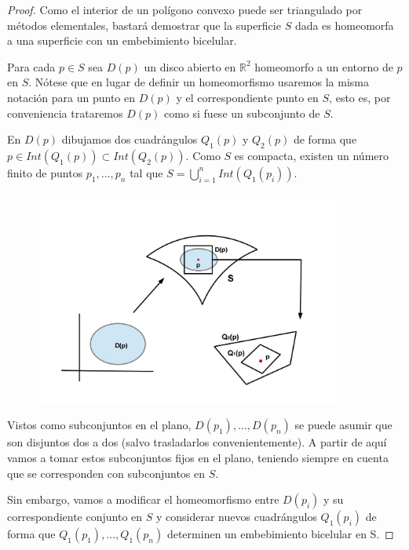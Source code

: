 \begin{proof}

	Como el interior de un polígono convexo puede ser triangulado por métodos elementales, bastará demostrar que la superficie $S$ dada es homeomorfa a una superficie con un embebimiento bicelular.

	Para cada $p \in S$ sea $D(p)$ un disco abierto en $\mathbb{R}^2$ homeomorfo a un entorno de $p$ en $S$. Nótese que en lugar de definir un homeomorfismo usaremos la misma notación para un punto en $D(p)$ y el correspondiente punto en $S$, esto es,  por conveniencia trataremos $D(p)$ como si fuese un subconjunto de $S$.

	En $D(p)$ dibujamos dos cuadrángulos $Q_{1}(p)$ y $Q_{2}(p)$ de forma que $p \in Int(Q_{1}(p)) \subset Int(Q_{2}(p))$. Como $S$ es  compacta, existen un número finito de puntos $p_{1},...,p_{n}$ tal que $S = \bigcup_{i = 1}^{n} Int(Q_{1}(p_{i}))$.

\begin{figure}[h]
\centering
\begin{minipage}[c]{\textwidth}
\centering
    \includegraphics[width=10.0cm]{images/pic1.jpg}
\end{minipage}
\end{figure}

	Vistos como subconjuntos en el plano, $D(p_{1}),...,D(p_{n})$ se puede asumir que son disjuntos dos a dos (salvo trasladarlos convenientemente). A partir de aquí vamos a tomar estos subconjuntos fijos en el plano, teniendo siempre en cuenta que se corresponden con subconjuntos en $S$.

	Sin embargo, vamos a modificar el homeomorfismo entre $D(p_i)$ y su correspondiente conjunto en $S$ y considerar nuevos cuadrángulos $Q_{1}(p_i)$ de forma que $Q_{1}(p_{1}),...,Q_{1}(p_{n})$  determinen un embebimiento bicelular en S.


\end{proof}
